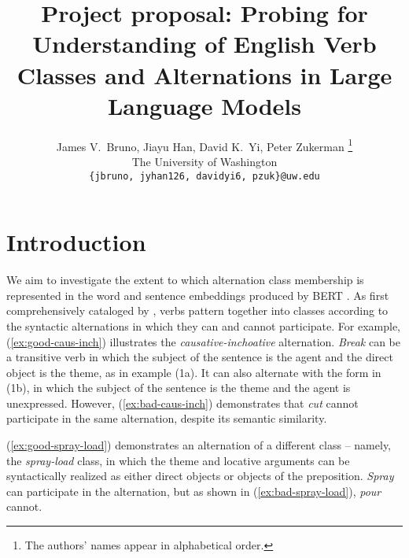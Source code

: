 \documentclass[11pt]{article}
\title{Project proposal: Probing for Understanding of English Verb Classes and Alternations in Large Language Models}
\author{James V.~Bruno, Jiayu Han, David K.~Yi, Peter Zukerman \thanks{ The authors' names appear in alphabetical order.}\\
The University of Washington\\
  \texttt{\{jbruno, jyhan126, davidyi6, pzuk\}@uw.edu}}
\begin{document}
\maketitle

\section{Introduction}

We aim to investigate the extent to which alternation class membership is represented in the word and sentence embeddings produced by BERT \citep{bertpaper}.  As first comprehensively cataloged by \citet{levin1993}, verbs pattern together into classes according to the syntactic alternations in which they can and cannot participate.  For example, (\ref{ex:good-caus-inch}) illustrates the \emph{causative-inchoative} alternation.  \emph{Break} can be a transitive verb in which the subject of the sentence is the agent and the direct object is the theme, as in example (1a).  It can also alternate with the form in (1b), in which the subject of the sentence is the theme and the agent is unexpressed. %
However, (\ref{ex:bad-caus-inch}) demonstrates that \emph{cut} cannot participate in the same alternation, despite its semantic similarity.

\begin{exe}
    \ex
        \label{ex:good-caus-inch}
        \begin{xlist}
        \end{xlist}

    \ex
        \label{ex:bad-caus-inch}
        \begin{xlist}
        \end{xlist}
\end{exe}

(\ref{ex:good-spray-load}) demonstrates an alternation of a different class -- namely, the \emph{spray-load} class, in which the theme and locative arguments can be syntactically realized as either direct objects or objects of the preposition.  \emph{Spray} can participate in the alternation, but as shown in (\ref{ex:bad-spray-load}), \emph{pour} cannot.

\begin{exe}
    \ex 
        \label{ex:good-spray-load}
        \begin{xlist}
        \end{xlist}

    \ex 
        \label{ex:bad-spray-load}
        \begin{xlist}
        \end{xlist}
\end{exe}
\end{document}
